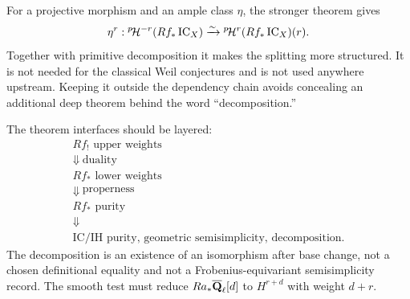 \begin{remark}
For a projective morphism and an ample class \(\eta\), the stronger theorem
gives
\[
  \eta^r:{}^{p}\!\mathcal H^{-r}(Rf_*\operatorname{IC}_X)
  \xrightarrow{\sim}{}^{p}\!\mathcal H^r(Rf_*\operatorname{IC}_X)(r).
\]
Together with primitive decomposition it makes the splitting more structured.
It is not needed for the classical Weil conjectures and is not used anywhere
upstream.  Keeping it outside the dependency chain avoids concealing an
additional deep theorem behind the word “decomposition.”
\end{remark}

\begin{formalization}
The theorem interfaces should be layered:
\[
\begin{array}{c}
 Rf_!\text{ upper weights}\\
 \Downarrow\ \text{duality}\\
 Rf_*\text{ lower weights}\\
 \Downarrow\ \text{properness}\\
 Rf_*\text{ purity}\\
 \Downarrow\\
 \text{IC/IH purity, geometric semisimplicity, decomposition.}
\end{array}
\]
The decomposition is an existence of an isomorphism after base change, not a
chosen definitional equality and not a Frobenius-equivariant semisimplicity
record.  The smooth test must reduce
\(Ra_*\overline{\mathbf Q}_\ell[d]\) to \(H^{r+d}\) with weight \(d+r\).
\end{formalization}
